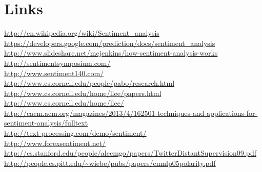 \section{Links}
\url{http://en.wikipedia.org/wiki/Sentiment_analysis}\\
\url{https://developers.google.com/prediction/docs/sentiment_analysis}\\
\url{http://www.slideshare.net/mcjenkins/how-sentiment-analysis-works}\\
\url{http://sentimentsymposium.com/}\\
\url{http://www.sentiment140.com/}\\
\url{http://www.cs.cornell.edu/people/pabo/research.html}\\
\url{http://www.cs.cornell.edu/home/llee/papers.html}\\
\url{http://www.cs.cornell.edu/home/llee/}\\
\url{http://cacm.acm.org/magazines/2013/4/162501-techniques-and-applications-for-sentiment-analysis/fulltext}\\
\url{http://text-processing.com/demo/sentiment/}\\
\url{http://www.forexsentiment.net/}\\
\url{http://cs.stanford.edu/people/alecmgo/papers/TwitterDistantSupervision09.pdf}\\
\url{http://people.cs.pitt.edu/~wiebe/pubs/papers/emnlp05polarity.pdf}\\


